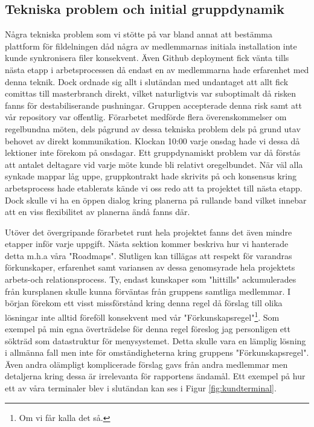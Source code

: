 \documentclass{article}
\theoremstyle{remark}                                         %
\begin{document}
\begin{figure}
\end{figure}

\subsection{Tekniska problem och initial gruppdynamik}
Några tekniska problem som vi stötte på var bland annat att bestämma plattform för fildelningen dåd några av medlemmarnas initiala installation inte kunde synkronisera filer konsekvent.
Även  Github deployment fick vänta tills nästa etapp i arbetsprocessen då endast en av medlemmarna hade erfarenhet med denna teknik. Dock ordnade sig allt i slutändan med undantaget att allt fick  comittas till masterbranch direkt, vilket naturligtvis var suboptimalt då risken fanns för destabiliserande pushningar. Gruppen accepterade denna risk samt att vår repository  var offentlig. Förarbetet medförde flera överenskommelser om regelbundna möten, dels pågrund av dessa tekniska problem dels på grund utav behovet av direkt kommunikation. Klockan 10:00 varje onsdag hade vi dessa då lektioner inte förekom på onsdagar. Ett gruppdynamiskt problem var då förstås att antalet deltagare vid varje möte kunde bli relativt oregelbundet. När väl alla synkade mappar låg uppe, gruppkontrakt hade skrivits på och konsensus kring arbetsprocess hade etablerats kände vi oss redo att ta projektet till nästa etapp. Dock skulle vi ha en öppen dialog kring planerna på rullande band vilket innebar att en viss flexibilitet av planerna ändå fanns där.

Utöver det övergripande förarbetet runt hela projektet fanns det även mindre etapper inför varje uppgift. Nästa sektion kommer beskriva hur vi hanterade detta m.h.a våra "Roadmaps". Slutligen kan tillägas att respekt för varandras förkunskaper, erfarenhet samt variansen av dessa genomsyrade hela projektets arbets-och relationsprocess. Ty, endast kunskaper som "hittills" ackumulerades från kursplanen skulle kunna förväntas från gruppens samtliga medlemmar. I början förekom ett visst missförstånd kring denna regel då förslag till olika lösningar inte alltid föreföll konsekvent med vår "Förkunskapsregel"\footnote{Om vi får kalla det så.}. Som exempel på min egna överträdelse för denna regel föreslog jag personligen ett sökträd som datastruktur för menysystemet. Detta skulle vara en lämplig lösning i allmänna fall men inte för omständigheterna kring gruppens "Förkunskapsregel". Även andra olämpligt komplicerade förslag gavs från andra medlemmar men detaljerna kring dessa är irrelevanta för rapportens ändamål. Ett exempel på hur ett av våra terminaler blev i slutändan kan ses i Figur \ref{fig:kundterminal}.
\end{document}
